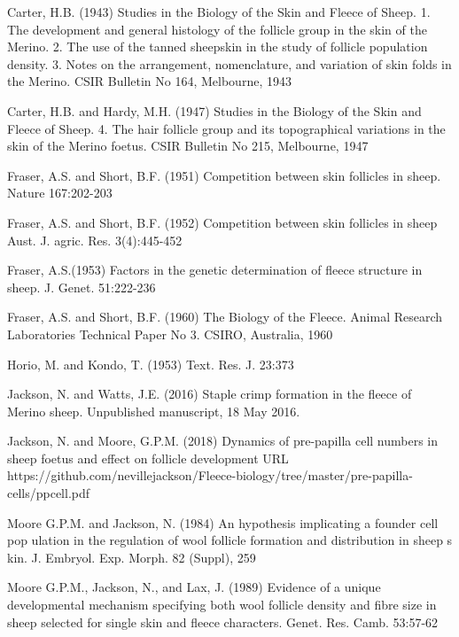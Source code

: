 \documentclass[titlepage]{article}  %
\begin{document}
\begin{thebibliography}{99}

Carter, H.B. (1943) Studies in the Biology of the Skin and Fleece of Sheep. 1. The development and general histology of the follicle group in the skin of the Merino. 2. The use of the tanned sheepskin in the study of follicle population density. 3. Notes on the arrangement, nomenclature, and variation of skin folds in the Merino. CSIR Bulletin No 164, Melbourne, 1943

Carter, H.B. and Hardy, M.H. (1947) Studies in the Biology of the Skin and Fleece of Sheep. 4. The hair follicle group and its topographical variations in the skin of the Merino foetus. CSIR Bulletin No 215, Melbourne, 1947

Fraser, A.S. and Short, B.F. (1951) Competition between skin follicles in sheep. Nature 167:202-203

Fraser, A.S. and Short, B.F. (1952) Competition between skin follicles in sheep Aust. J. agric. Res. 3(4):445-452

Fraser, A.S.(1953) Factors in the genetic determination of fleece structure in sheep. J. Genet. 51:222-236

Fraser, A.S. and Short, B.F. (1960) The Biology of the Fleece. Animal Research Laboratories Technical Paper No 3. CSIRO, Australia, 1960

Horio, M. and Kondo, T. (1953) Text. Res. J. 23:373

Jackson, N. and Watts, J.E. (2016) Staple crimp formation in the fleece of Merino sheep. Unpublished manuscript, 18 May 2016.


Jackson, N. and Moore, G.P.M. (2018)
Dynamics of pre-papilla cell numbers in sheep foetus and effect on follicle development URL https://github.com/nevillejackson/Fleece-biology/tree/master/pre-papilla-cells/ppcell.pdf

Moore G.P.M. and Jackson, N. (1984) An hypothesis implicating a founder cell pop
ulation in the regulation of wool follicle formation and distribution in sheep s
kin. J. Embryol. Exp. Morph. 82 (Suppl), 259

Moore G.P.M., Jackson, N., and Lax, J. (1989) Evidence of a unique developmental mechanism specifying both wool follicle density and fibre size in sheep selected for single skin and fleece characters. Genet. Res. Camb. 53:57-62


\end{thebibliography}
\end{document}
